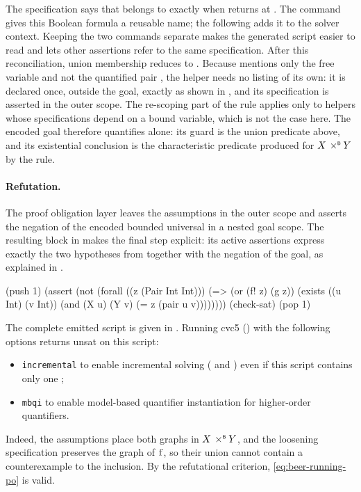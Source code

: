 The specification says that  belongs to  exactly when  returns  at .
The  command gives this Boolean formula a reusable name; the following  adds it to the solver context.
Keeping the two commands separate makes the generated script easier to read and lets other assertions refer to the same specification.
After this reconciliation, union membership reduces to .
Because  mentions only the free variable  and not the quantified pair , the helper  needs no listing of its own: it is declared once, outside the goal, exactly as shown in , and its specification is asserted in the outer scope.
The re-scoping part of the  rule applies only to helpers whose specifications depend on a bound variable, which is not the case here.
The encoded goal therefore quantifies  alone: its guard is the union predicate above, and its existential conclusion is the characteristic predicate produced for \(X\mathbin{\,\times^{\scriptscriptstyle{\mathsf{B}}}} Y\) by the  rule.

\paragraph{Refutation.}
The proof obligation layer leaves the assumptions in the outer scope and asserts the negation of the encoded bounded universal in a nested goal scope.
The resulting block in  makes the final step explicit: its active assertions express exactly the two hypotheses from  together with the negation of the goal, as explained in .

\begin{smtlisting}[title={Negated goal.}, label=lst:beer-running-refutation, float=h]
(push 1)
  (assert
    (not
      (forall ((z (Pair Int Int)))
        (=> (or (f! z) (g z))
          (exists ((u Int) (v Int))
            (and (X u) (Y v) (= z (pair u v))))))))
  (check-sat)
(pop 1)
\end{smtlisting}

The complete emitted script is given in .
Running cvc5 () with the following options returns \textsf{unsat} on this script:
\begin{itemize}
  \item \texttt{incremental} to enable incremental solving ( and ) even if this script contains only one ;
  \item \texttt{mbqi} to enable model-based quantifier instantiation for higher-order quantifiers.
\end{itemize}
Indeed, the assumptions place both graphs in \(X\mathbin{\,\times^{\scriptscriptstyle{\mathsf{B}}}} Y\), and the loosening specification preserves the graph of \(\var{f}\), so their union cannot contain a counterexample to the inclusion.
By the refutational criterion, \cref{eq:beer-running-po} is valid.

